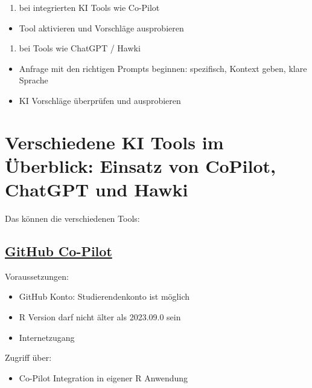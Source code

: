\documentclass[
  letterpaper,
  DIV=11]{scrreprt}
\providecommand{\tightlist}{%
  \setlength{\itemsep}{0pt}\setlength{\parskip}{0pt}}\usepackage{longtable,booktabs,array}
\begin{document}
\begin{enumerate}
\def\labelenumi{\arabic{enumi}.}
\setcounter{enumi}{2}
\tightlist
\item
  bei integrierten KI Tools wie Co-Pilot
\end{enumerate}

\begin{itemize}
\tightlist
\item
  Tool aktivieren und Vorschläge ausprobieren
\end{itemize}

\begin{enumerate}
\def\labelenumi{\arabic{enumi}.}
\setcounter{enumi}{2}
\tightlist
\item
  bei Tools wie ChatGPT / Hawki
\end{enumerate}

\begin{itemize}
\tightlist
\item
  Anfrage mit den richtigen Prompts beginnen: spezifisch, Kontext geben,
  klare Sprache
\item
  KI Vorschläge überprüfen und ausprobieren
\end{itemize}

\section{Verschiedene KI Tools im Überblick: Einsatz von CoPilot,
ChatGPT und
Hawki}\label{verschiedene-ki-tools-im-uxfcberblick-einsatz-von-copilot-chatgpt-und-hawki}

Das können die verschiedenen Tools:

\subsection{\texorpdfstring{\href{https://docs.posit.co/ide/user/ide/guide/tools/copilot.html}{GitHub
Co-Pilot}}{GitHub Co-Pilot}}\label{github-co-pilot}

Voraussetzungen:

\begin{itemize}
\item
  GitHub Konto: Studierendenkonto ist möglich
\item
  R Version darf nicht älter als 2023.09.0 sein
\item
  Internetzugang
\end{itemize}

Zugriff über:

\begin{itemize}
\tightlist
\item
  Co-Pilot Integration in eigener R Anwendung
\end{itemize}
\end{document}
